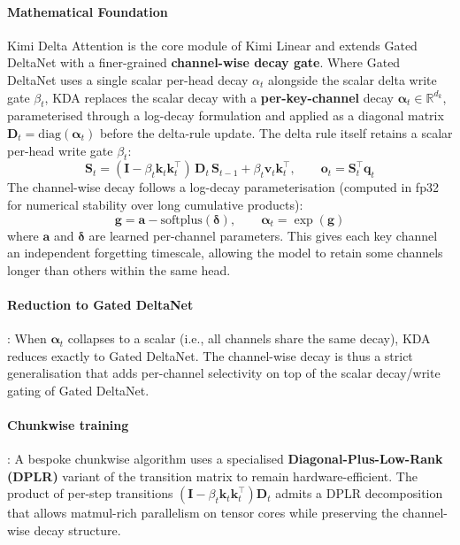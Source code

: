 \paragraph{Mathematical Foundation}

Kimi Delta Attention \citep{kimi_kda_2025} is the core module of Kimi Linear and extends Gated DeltaNet with a finer-grained \textbf{channel-wise decay gate}. Where Gated DeltaNet uses a single scalar per-head decay $\alpha_t$ alongside the scalar delta write gate $\beta_t$, KDA replaces the scalar decay with a \textbf{per-key-channel} decay $\boldsymbol{\alpha}_t \in \mathbb{R}^{d_k}$, parameterised through a log-decay formulation and applied as a diagonal matrix $\mathbf{D}_t = \mathrm{diag}(\boldsymbol{\alpha}_t)$ before the delta-rule update. The delta rule itself retains a scalar per-head write gate $\beta_t$:
\[
\mathbf{S}_t = (\mathbf{I} - \beta_t \mathbf{k}_t \mathbf{k}_t^\top)\, \mathbf{D}_t\, \mathbf{S}_{t-1} + \beta_t \mathbf{v}_t \mathbf{k}_t^\top, \qquad \mathbf{o}_t = \mathbf{S}_t^\top \mathbf{q}_t
\]
The channel-wise decay follows a log-decay parameterisation (computed in fp32 for numerical stability over long cumulative products):
\[
\mathbf{g} = \mathbf{a} - \mathrm{softplus}(\boldsymbol{\delta}), \qquad \boldsymbol{\alpha}_t = \exp(\mathbf{g})
\]
where $\mathbf{a}$ and $\boldsymbol{\delta}$ are learned per-channel parameters. This gives each key channel an independent forgetting timescale, allowing the model to retain some channels longer than others within the same head.

\paragraph{Reduction to Gated DeltaNet}: When $\boldsymbol{\alpha}_t$ collapses to a scalar (i.e., all channels share the same decay), KDA reduces exactly to Gated DeltaNet. The channel-wise decay is thus a strict generalisation that adds per-channel selectivity on top of the scalar decay/write gating of Gated DeltaNet.

\paragraph{Chunkwise training}: A bespoke chunkwise algorithm uses a specialised \textbf{Diagonal-Plus-Low-Rank (DPLR)} variant of the transition matrix to remain hardware-efficient. The product of per-step transitions $(\mathbf{I} - \beta_t \mathbf{k}_t \mathbf{k}_t^\top)\mathbf{D}_t$ admits a DPLR decomposition that allows matmul-rich parallelism on tensor cores while preserving the channel-wise decay structure.

